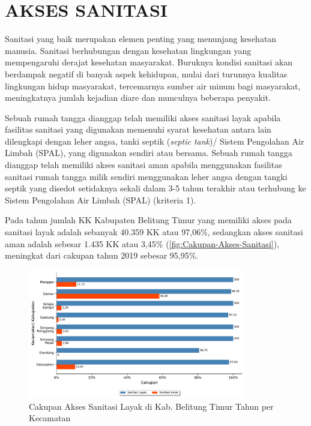 \section{AKSES SANITASI}
Sanitasi yang baik merupakan elemen penting yang menunjang kesehatan manusia.
Sanitasi berhubungan dengan kesehatan lingkungan yang mempengaruhi derajat kesehatan masyarakat. 
Buruknya kondisi sanitasi akan berdampak negatif di banyak aspek kehidupan, mulai dari turunnya kualitas lingkungan hidup masyarakat, tercemarnya sumber air minum bagi masyarakat, meningkatnya jumlah kejadian diare dan munculnya beberapa penyakit. 

Sebuah rumah tangga dianggap telah memiliki akses sanitasi layak apabila fasilitas sanitasi yang digunakan memenuhi syarat kesehatan antara lain dilengkapi dengan leher angsa, tanki septik (\emph{septic tank})/ Sistem Pengolahan Air Limbah (SPAL), yang digunakan sendiri atau bersama.
Sebuah rumah tangga dianggap telah memiliki akses sanitasi aman apabila menggunakan fasilitas sanitasi rumah tangga milik sendiri menggunakan leher angsa dengan tangki septik yang
disedot setidaknya sekali dalam 3-5 tahun terakhir atau terhubung ke Sistem Pengolahan Air Limbah (SPAL) (kriteria 1).

Pada tahun \tP jumlah KK Kabupaten Belitung Timur yang memiliki akses pada
sanitasi layak adalah sebanyak 40.359 KK atau 97,06\%, sedangkan akses sanitasi aman adalah sebesar 1.435 KK atau 3,45\% (\autoref{fig:Cakupan-Akses-Sanitasi}), meningkat dari cakupan tahun 2019 sebesar 95,95\%.

\begin{figure}[H]
    \centering
    \includegraphics[width=0.85\textwidth]{bab_07/bab_07_02_aksesSanitasi}
    \caption{Cakupan Akses Sanitasi Layak di Kab. Belitung Timur Tahun \tP per Kecamatan}
    \label{fig:Cakupan-Akses-Sanitasi}
\end{figure}

